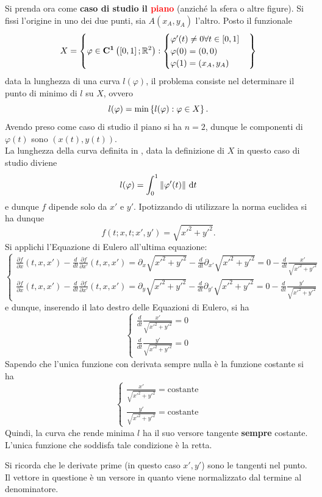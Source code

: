 Si prenda ora come \textbf{caso di studio il \textcolor{red}{piano}} (anziché la sfera o altre figure). Si fissi l'origine in uno dei due punti, sia $A(x_A,y_A)$ l'altro. Posto il funzionale
\[
	X = \left\{
		\varphi \in \mathbf{C^{1}}\left(\left[ 0,1 \right]; \mathbb{R}^2\right) : 
		\begin{cases}
			\varphi'(t) \neq 0 \forall t \in \left[ 0,1 \right]\\
			\varphi(0) = \left( 0,0 \right)\\
			\varphi(1) = \left( x_A,y_A \right)
		\end{cases}
	\right\}
\]
data la lunghezza di una curva $l(\varphi)$, il problema consiste nel determinare il punto di minimo di $l$ su $X$, ovvero
\[ l(\varphi) = \min\left\{l(\varphi) : \varphi \in X\right\}. \]
Avendo preso come caso di studio il piano si ha $n = 2$,
dunque le componenti di $\varphi(t)$ sono $ \left(x(t),y(t)\right) $.\\
La lunghezza della curva definita in , data la definizione di $X$ in questo caso di studio diviene
\[ l(\varphi)=\int_0^1 \left\|\varphi'(t)\right\|\,\mathrm{d}{t} \]
e dunque $f$ dipende solo da $x' \text{ e } y'$. Ipotizzando di utilizzare la norma euclidea si ha dunque
\[ f(t; x, t; x', y') = \sqrt{x'^2 + y'^2}. \]
Si applichi l'Equazione di Eulero all'ultima equazione:
\[
	\begin{cases}
		\frac{\partial f}{\partial x}(t, x, x') - \frac{d}{dt}\frac{\partial f}{\partial x'}(t, x, x') =
		\partial_x \sqrt{x'^2 + y'^2} - \frac{d}{dt}\partial_{x'} \sqrt{x'^2 + y'^2} =
		0 - \frac{d}{dt} \frac{x'}{\sqrt{x'^2 + y'^2}}
		\\
		\frac{\partial f}{\partial x}(t, x, x') - \frac{d}{dt}\frac{\partial f}{\partial x'}(t, x, x') =
		\partial_y \sqrt{x'^2 + y'^2} - \frac{d}{dt}\partial_{y'} \sqrt{x'^2 + y'^2} =
		0 - \frac{d}{dt} \frac{y'}{\sqrt{x'^2 + y'^2}}
	\end{cases}
\]
e dunque, inserendo il lato destro delle Equazioni di Eulero, si ha
\[
	\begin{cases}
		\frac{d}{dt} \frac{x'}{\sqrt{x'^2 + y'^2}} = 0\\
		\frac{d}{dt} \frac{y'}{\sqrt{x'^2 + y'^2}} = 0
	\end{cases}
\]
Sapendo che l'unica funzione con derivata sempre nulla è la funzione costante si ha
\[
	\begin{cases}
		\frac{x'}{\sqrt{x'^2 + y'^2}} = \text{costante}
		\\
		\frac{y'}{\sqrt{x'^2 + y'^2}} = \text{costante}
	\end{cases}
\]
Quindi, la curva che rende minima $l$ ha il suo versore tangente \textbf{sempre} costante. L'unica funzione che soddisfa tale condizione è la retta.
\begin{note}
	Si ricorda che le derivate prime (in questo caso $x', y'$) sono le tangenti nel punto.\\
	Il vettore in questione è un versore in quanto viene normalizzato dal termine al denominatore.
\end{note}

